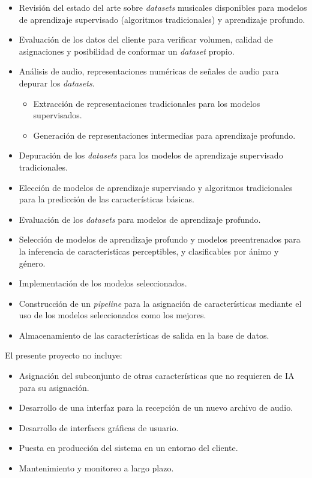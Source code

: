 \documentclass[
11pt, %
]{charter}
\begin{document}
\begin{itemize}
  \item Revisión del estado del arte sobre \textit{datasets} musicales disponibles para modelos de aprendizaje supervisado (algoritmos tradicionales) y aprendizaje profundo.
  \item Evaluación de los datos del cliente para verificar volumen, calidad de asignaciones y posibilidad de conformar un \textit{dataset} propio.
  \item Análisis de audio, representaciones numéricas de señales de audio para depurar los \textit{datasets}.
  \begin{itemize}
    \item Extracción de representaciones tradicionales para los modelos supervisados.
		\item Generación de representaciones intermedias para aprendizaje profundo.
	\end{itemize}
  \item Depuración de los \textit{datasets} para los modelos de aprendizaje supervisado tradicionales.
	\item Elección de modelos de aprendizaje supervisado y algoritmos tradicionales para la predicción de las características básicas.
  \item Evaluación de los \textit{datasets} para modelos de aprendizaje profundo.
  \item Selección de modelos de aprendizaje profundo y modelos preentrenados para la inferencia de características perceptibles, y clasificables por ánimo y género.
  \item Implementación de los modelos seleccionados.
  \item Construcción de un  \textit{pipeline} para la asignación de características mediante el uso de los modelos seleccionados como los mejores.
  \item Almacenamiento de las características de salida en la base de datos.
\end{itemize}



El presente proyecto no incluye:
\begin{itemize}
  \item Asignación del subconjunto de otras características que no requieren de IA para su asignación.
  \item Desarrollo de una interfaz para la recepción de un nuevo archivo de audio.
  \item Desarrollo de interfaces gráficas de usuario.
  \item Puesta en producción del sistema en un entorno del cliente.
  \item Mantenimiento y monitoreo a largo plazo.
\end{itemize}
\end{document}
